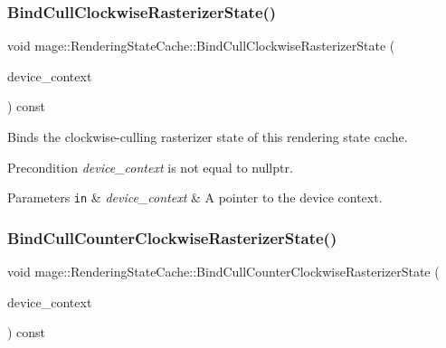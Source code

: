 \subsubsection{\texorpdfstring{Bind\+Cull\+Clockwise\+Rasterizer\+State()}{BindCullClockwiseRasterizerState()}}
{\footnotesize\ttfamily void mage\+::\+Rendering\+State\+Cache\+::\+Bind\+Cull\+Clockwise\+Rasterizer\+State (\begin{DoxyParamCaption}\item[{I\+D3\+D11\+Device\+Context2 $\ast$}]{device\+\_\+context }\end{DoxyParamCaption}) const\hspace{0.3cm}{\ttfamily [noexcept]}}

Binds the clockwise-\/culling rasterizer state of this rendering state cache.

\begin{DoxyPrecond}{Precondition}
{\itshape device\+\_\+context} is not equal to {\ttfamily nullptr}. 
\end{DoxyPrecond}

\begin{DoxyParams}[1]{Parameters}
\mbox{\tt in}  & {\em device\+\_\+context} & A pointer to the device context. \\
\hline
\end{DoxyParams}
\hypertarget{structmage_1_1_rendering_state_cache_aa9330c398a1490ae79079e0b75d62be9}{}\label{structmage_1_1_rendering_state_cache_aa9330c398a1490ae79079e0b75d62be9} 
\subsubsection{\texorpdfstring{Bind\+Cull\+Counter\+Clockwise\+Rasterizer\+State()}{BindCullCounterClockwiseRasterizerState()}}
{\footnotesize\ttfamily void mage\+::\+Rendering\+State\+Cache\+::\+Bind\+Cull\+Counter\+Clockwise\+Rasterizer\+State (\begin{DoxyParamCaption}\item[{I\+D3\+D11\+Device\+Context2 $\ast$}]{device\+\_\+context }\end{DoxyParamCaption}) const\hspace{0.3cm}{\ttfamily [noexcept]}}

